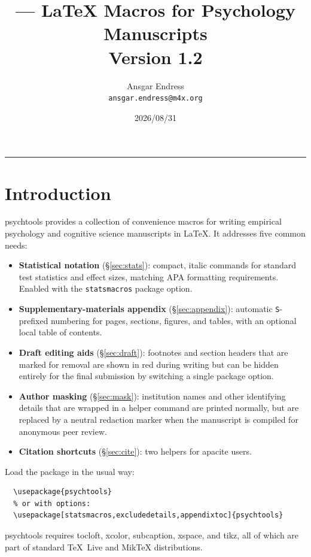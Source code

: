 \documentclass[a4paper,11pt]{article}
\title{\pkg{psychtools} --- LaTeX Macros for Psychology Manuscripts\\[0.5ex]
  \large Version 1.2}
\author{Ansgar Endress\\\texttt{ansgar.endress@m4x.org}}
\date{2026/08/31}
\newcommand{\pkg}[1]{\textsf{#1}}
\newcommand{\opt}[1]{\texttt{#1}}
\begin{document}
\maketitle
\tableofcontents
\bigskip\hrule\bigskip

\section{Introduction}

\pkg{psychtools} provides a collection of convenience macros for writing
empirical psychology and cognitive science manuscripts in \LaTeX. It addresses
five common needs:

\begin{itemize}
  \item \textbf{Statistical notation} (\S\ref{sec:stats}): compact, italic
        commands for standard test statistics and effect sizes, matching
        APA formatting requirements. Enabled with the \opt{statsmacros}
        package option.
  \item \textbf{Supplementary-materials appendix} (\S\ref{sec:appendix}):
        automatic \texttt{S}-prefixed numbering for pages, sections, figures,
        and tables, with an optional local table of contents.
  \item \textbf{Draft editing aids} (\S\ref{sec:draft}): footnotes and
        section headers that are marked for removal are shown in red during
        writing but can be hidden entirely for the final submission by
        switching a single package option.
  \item \textbf{Author masking} (\S\ref{sec:mask}): institution names and
        other identifying details that are wrapped in a helper command are
        printed normally, but are replaced by a neutral redaction marker
        when the manuscript is compiled for anonymous peer review.
  \item \textbf{Citation shortcuts} (\S\ref{sec:cite}): two helpers for
        \pkg{apacite} users.
\end{itemize}

\noindent Load the package in the usual way:
\begin{verbatim}
  \usepackage{psychtools}
  % or with options:
  \usepackage[statsmacros,excludedetails,appendixtoc]{psychtools}
\end{verbatim}

\pkg{psychtools} requires \pkg{tocloft}, \pkg{xcolor}, \pkg{subcaption},
\pkg{xspace}, and \pkg{tikz}, all of which are part of standard \TeX~Live and
Mik\TeX{} distributions.
\end{document}
